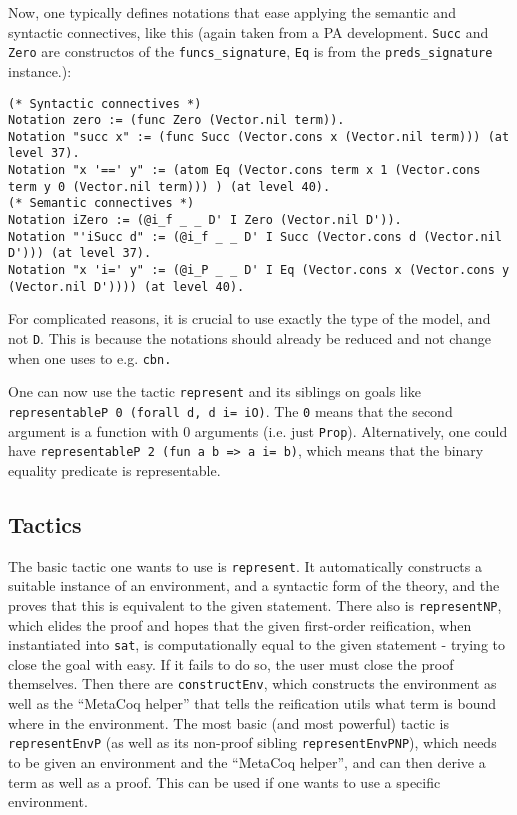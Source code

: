 \documentclass[11pt,a4paper]{article}
\begin{document}
Now, one typically defines notations that ease applying the semantic and syntactic connectives, like this (again taken from a PA development. \lstinline|Succ| and \lstinline|Zero| are constructos of the \lstinline|funcs_signature|, \lstinline|Eq| is from the \lstinline|preds_signature| instance.):
\begin{lstlisting}
(* Syntactic connectives *)
Notation zero := (func Zero (Vector.nil term)).
Notation "succ x" := (func Succ (Vector.cons x (Vector.nil term))) (at level 37).
Notation "x '==' y" := (atom Eq (Vector.cons term x 1 (Vector.cons term y 0 (Vector.nil term))) ) (at level 40).
(* Semantic connectives *)
Notation iZero := (@i_f _ _ D' I Zero (Vector.nil D')).
Notation "'iSucc d" := (@i_f _ _ D' I Succ (Vector.cons d (Vector.nil D'))) (at level 37).
Notation "x 'i=' y" := (@i_P _ _ D' I Eq (Vector.cons x (Vector.cons y (Vector.nil D')))) (at level 40).
\end{lstlisting}

For complicated reasons, it is crucial to use exactly the type of the model, and not \lstinline|D|. This is because the notations should already be reduced and not change when one uses to e.g. \lstinline|cbn.|

One can now use the tactic \lstinline|represent| and its siblings on goals like \lstinline|representableP 0 (forall d, d i= iO)|. The \lstinline|0| means that the second argument is a function with 0 arguments (i.e. just \lstinline|Prop|). Alternatively, one could have \lstinline|representableP 2 (fun a b => a i= b)|, which means that the binary equality predicate is representable.
\subsection{Tactics}
The basic tactic one wants to use is \lstinline|represent|. It automatically constructs a suitable instance of an environment, and a syntactic form of the theory, and the proves that this is equivalent to the given statement. There also is \lstinline|representNP|, which elides the proof and hopes that the given first-order reification, when instantiated into \lstinline|sat|, is computationally equal to the given statement - trying to close the goal with easy. If it fails to do so, the user must close the proof themselves.
Then there are \lstinline|constructEnv|, which constructs the environment as well as the \enquote{MetaCoq helper} that tells the reification utils what term is bound where in the environment.
The most basic (and most powerful) tactic is \lstinline|representEnvP| (as well as its non-proof sibling \lstinline|representEnvPNP|), which needs to be given an environment and the \enquote{MetaCoq helper}, and can then derive a term as well as a proof. This can be used if one wants to use a specific environment.
\end{document}
